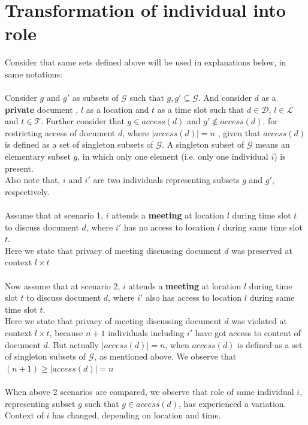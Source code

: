 \documentclass{article}
\begin{document}
\section{Transformation of individual into role}
\noindent
Consider that same sets defined above will be used in explanations below, in same notations: \\ \\
\noindent
Consider $g$ and $g'$ as subsets of $\mathcal{G}$ such that $g, g' \subseteq \mathcal{G}$. And consider $d$ as a \textbf{private} document , $l$ as a location and $t$ as a time slot such that $d \in \mathcal{D}$, $l \in \mathcal{L}$ and $t \in \mathcal{T}$.
Further consider that $g \in access(d)$ and $g' \notin access(d)$, for restricting access of document $d$, where $|access(d)| = n$ , given that $access(d)$ is defined as a set of singleton subsets of $\mathcal{G}$. A singleton subset of $\mathcal{G}$ means an elementary subset $g$, in which only one element (i.e. only one individual $i$) is present.\\ 
Also note that, $i$ and $i'$ are two individuals representing subsets $g$ and $g'$, respectively. \\ \\
\noindent
Assume that at scenario 1, $i$ attends a \textbf{meeting} at location $l$ during time slot $t$ to discuss document $d$, where $i'$ has no access to location $l$ during same time slot $t$. \\
Here we state that privacy of meeting discussing document $d$ was preserved at context $l \times t$ \\ \\ 
\noindent
Now assume that at scenario 2, $i$ attends a \textbf{meeting} at location $l$ during time slot $t$ to discuss document $d$, where $i'$ also has access to location $l$ during same time slot $t$. \\
Here we state that privacy of meeting discussing document $d$ was violated at context $l \times t$, because $n + 1$ individuals including $i'$ have got access to content of document $d$. But actually $|access(d)| = n$, when $access(d)$ is defined as a set of singleton subsets of $\mathcal{G}$, as mentioned above. We observe that $(n + 1) \geq |access(d)| = n$ \\ \\ 
\noindent
When above 2 scenarios are compared, we observe that role of same individual $i$, representing subset $g$ such that $g \in access(d)$, has experienced a variation. Context of $i$ has changed, depending on location and time. \\ \\
\end{document}
